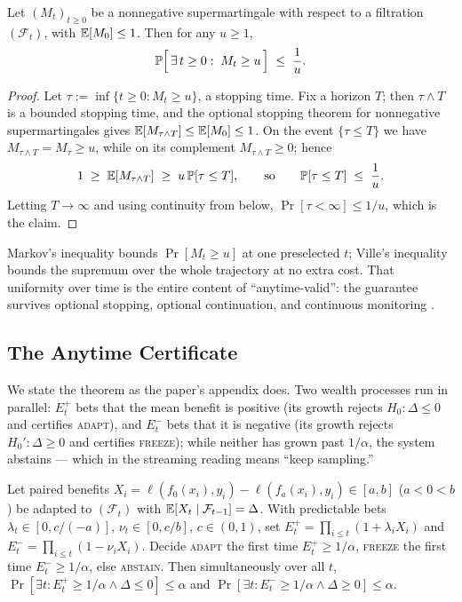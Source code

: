\begin{lemma}
\label{sec:t2-lem-ville}
Let $(M_t)_{t\ge0}$ be a nonnegative supermartingale with respect to a filtration
$(\mathcal F_t)$, with $\E[M_0]\le1$. Then for any $u\ge1$,
\[
\Pr\Bigl[\,\exists\,t\ge0:\;M_t\ge u\,\Bigr]\;\le\;\frac{1}{u} .
\]
\end{lemma}

\begin{proof}
Let $\tau:=\inf\{t\ge0:M_t\ge u\}$, a stopping time. Fix a horizon $T$; then
$\tau\wedge T$ is a bounded stopping time, and the optional stopping theorem for
nonnegative supermartingales gives $\E[M_{\tau\wedge T}]\le\E[M_0]\le1$. On the event
$\{\tau\le T\}$ we have $M_{\tau\wedge T}=M_\tau\ge u$, while on its complement
$M_{\tau\wedge T}\ge0$; hence
\[
1\;\ge\;\E[M_{\tau\wedge T}]\;\ge\;u\,\Pr[\tau\le T] ,
\qquad\text{so}\qquad \Pr[\tau\le T]\;\le\;\frac1u .
\]
Letting $T\to\infty$ and using continuity from below,
$\Pr[\tau<\infty]\le1/u$, which is the claim. \qedhere
\end{proof}

Markov's inequality bounds $\Pr[M_t\ge u]$ at one preselected $t$; Ville's inequality
bounds the supremum over the whole trajectory at no extra cost. That uniformity over
time is the entire content of ``anytime-valid'': the guarantee survives optional
stopping, optional continuation, and continuous monitoring
\cite{howard2021timeuniform}.

\subsection{The Anytime Certificate}
\label{sec:t2-evalue-thm}

We state the theorem as the paper's appendix does. Two wealth processes run in
parallel: $E^+_t$ bets that the mean benefit is positive (its growth rejects
$H_0:\Delta\le0$ and certifies \textsc{adapt}), and $E^-_t$ bets that it is negative
(its growth rejects $H_0':\Delta\ge0$ and certifies \textsc{freeze}); while neither has
grown past $1/\alpha$, the system abstains --- which in the streaming reading means
``keep sampling.''

\begin{theorem}
\label{thm:evalue}
Let paired benefits $X_i=\ell(f_0(x_i),y_i)-\ell(f_a(x_i),y_i)\in[a,b]$ ($a<0<b$) be
adapted to $(\mathcal F_t)$ with $\E[X_t\mid\mathcal F_{t-1}]=\Delta$. With predictable
bets $\lambda_t\in[0,c/(-a)]$, $\nu_t\in[0,c/b]$, $c\in(0,1)$, set
$E_t^{+}=\prod_{i\le t}(1+\lambda_i X_i)$ and $E_t^{-}=\prod_{i\le t}(1-\nu_i X_i)$.
Decide \textsc{adapt} the first time $E_t^{+}\ge1/\alpha$, \textsc{freeze} the first time
$E_t^{-}\ge1/\alpha$, else \textsc{abstain}. Then simultaneously over all $t$,
$\Pr[\exists t: E_t^{+}\ge1/\alpha \wedge \Delta\le0]\le\alpha$ and
$\Pr[\exists t: E_t^{-}\ge1/\alpha \wedge \Delta\ge0]\le\alpha$.
\end{theorem}

